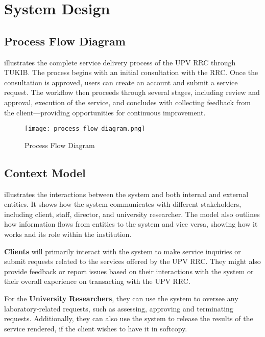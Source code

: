 \section{System Design}

\subsection{Process Flow Diagram}

 illustrates the complete service delivery process of the UPV RRC through TUKIB. The process begins with an initial consultation with the RRC. Once the consultation is approved, users can create an account and submit a service request. The workflow then proceeds through several stages, including review and approval, execution of the service, and concludes with collecting feedback from the client—providing opportunities for continuous improvement.

\begin{figure}[h]
	\centering 
	\texttt{[image: process\_flow\_diagram.png]}
	\caption{Process Flow Diagram}
	\label{fig:process_flow}
\end{figure}

\subsection{Context Model}

 illustrates the interactions between the system and both internal and external entities. It shows how the system communicates with different stakeholders, including client, staff, director, and university researcher. The model also outlines how information flows from entities to the system and vice versa, showing how it works and its role within the institution.

\textbf{Clients} will primarily interact with the system to make service inquiries or submit requests related to the services offered by the UPV RRC. They might also provide feedback or report issues based on their interactions with the system or their overall experience on transacting with the UPV RRC.

For the \textbf{University Researchers}, they can use the system to oversee any laboratory-related requests, such as assessing, approving and terminating requests. Additionally, they can also use the system to release the results of the service rendered, if the client wishes to have it in softcopy. 

